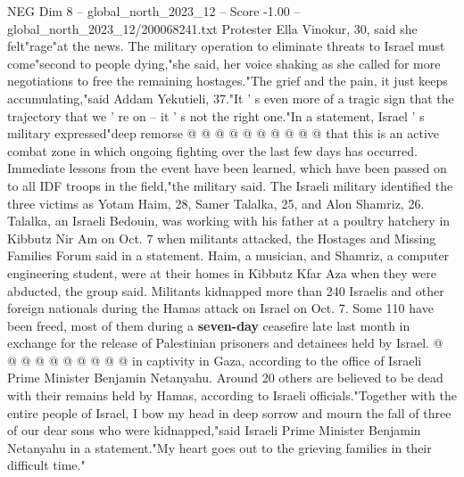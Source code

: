 \begin{textsample}{NEG Dim 8 – global\_north\_2023\_12 – Score -1.00 – global\_north\_2023\_12/200068241.txt}
Protester Ella Vinokur, 30, said she felt"rage"at the news.
The military operation to eliminate threats to Israel must come"second to people dying,"she said, her voice shaking as she called for more negotiations to free the remaining hostages."The grief and the pain, it just keeps accumulating,"said Addam Yekutieli, 37."It ' s even more of a tragic sign that the trajectory that we ' re on -- it ' s not the right one."In a statement, Israel ' s military expressed"deep remorse @ @ @ @ @ @ @ @ @ @ that this is an active combat zone in which ongoing fighting over the last few days has occurred.
Immediate lessons from the event have been learned, which have been passed on to all IDF troops in the field,"the military said.
The Israeli military identified the three victims as Yotam Haim, 28, Samer Talalka, 25, and Alon Shamriz, 26.
Talalka, an Israeli Bedouin, was working with his father at a poultry hatchery in Kibbutz Nir Am on Oct. 7 when militants attacked, the Hostages and Missing Families Forum said in a statement.
Haim, a musician, and Shamriz, a computer engineering student, were at their homes in Kibbutz Kfar Aza when they were abducted, the group said.
Militants kidnapped more than 240 Israelis and other foreign nationals during the Hamas attack on Israel on Oct. 7.
Some 110 have been freed, most of them during a \textbf{seven-day} ceasefire late last month in exchange for the release of Palestinian prisoners and detainees held by Israel. @ @ @ @ @ @ @ @ @ @ in captivity in Gaza, according to the office of Israeli Prime Minister Benjamin Netanyahu.
Around 20 others are believed to be dead with their remains held by Hamas, according to Israeli officials."Together with the entire people of Israel, I bow my head in deep sorrow and mourn the fall of three of our dear sons who were kidnapped,"said Israeli Prime Minister Benjamin Netanyahu in a statement."My heart goes out to the grieving families in their difficult time."

\end{textsample}
